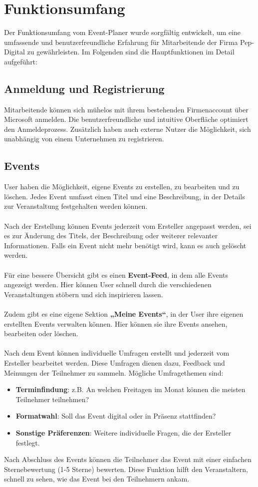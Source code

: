 \documentclass[a4paper,12pt]{article}
\begin{document}
\section{Funktionsumfang}
Der Funktionsumfang vom Event-Planer wurde sorgfältig entwickelt, um eine umfassende und benutzerfreundliche Erfahrung für Mitarbeitende der Firma Pep-Digital zu gewährleisten. Im Folgenden sind die Hauptfunktionen im Detail aufgeführt:
\subsection{Anmeldung und Registrierung}
 Mitarbeitende können sich mühelos mit ihrem bestehenden Firmenaccount über Microsoft anmelden. Die benutzerfreundliche und intuitive Oberfläche optimiert den Anmeldeprozess. Zusätzlich haben auch externe Nutzer die Möglichkeit, sich unabhängig von einem Unternehmen zu registrieren.
\subsection{Events}
User haben die Möglichkeit, eigene Events zu erstellen, zu bearbeiten und zu löschen. Jedes Event umfasst einen Titel und eine Beschreibung, in der Details zur Veranstaltung festgehalten werden können.\\\\
Nach der Erstellung können Events jederzeit vom Ersteller angepasst werden, sei es zur Änderung des Titels, der Beschreibung oder weiterer relevanter Informationen. Falls ein Event nicht mehr benötigt wird, kann es auch gelöscht werden.\\\\
Für eine bessere Übersicht gibt es einen \textbf{Event-Feed}, in dem alle Events angezeigt werden. Hier können User schnell durch die verschiedenen Veranstaltungen stöbern und sich inspirieren lassen.\\\\
Zudem gibt es eine eigene Sektion \textbf{„Meine Events“}, in der User ihre eigenen erstellten Events verwalten können. Hier können sie ihre Events ansehen, bearbeiten oder löschen.\\\\
Nach dem Event können individuelle Umfragen erstellt und jederzeit vom Ersteller bearbeitet werden. Diese Umfragen dienen dazu, Feedback und Meinungen der Teilnehmer zu sammeln. Mögliche Umfragethemen sind:
\begin{itemize}
    \item \textbf{Terminfindung}: z.B. An welchen Freitagen im Monat können die meisten Teilnehmer teilnehmen?
    \item \textbf{Formatwahl}: Soll das Event digital oder in Präsenz stattfinden?
    \item \textbf{Sonstige Präferenzen}: Weitere individuelle Fragen, die der Ersteller festlegt.
\end{itemize}
Nach Abschluss des Events können die Teilnehmer das Event mit einer einfachen Sternebewertung (1-5 Sterne) bewerten. Diese Funktion hilft den Veranstaltern, schnell zu sehen, wie das Event bei den Teilnehmern ankam.
\newpage
\end{document}
